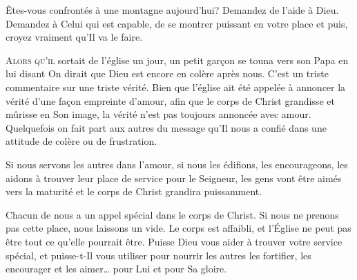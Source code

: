 Êtes-vous confrontés à une montagne aujourd'hui? Demandez de l'aide à Dieu.
 Demandez à Celui qui est capable, de se montrer puissant en votre place
 \ocadr et puis, croyez vraiment qu'Il va le faire.

\dvrule






\lettrine{A}{lors qu'il} sortait de l'église un jour,
 un petit gar\c{c}on se touna vers son Papa  en lui disant\frcolon {}
 \Og On dirait que Dieu est encore en colère après nous. \Fg{}
 C'est un triste commentaire sur une triste vérité.
 Bien que l'église ait été appelée à annoncer la vérité
 d'une fa\c{c}on empreinte d'amour, afin que le corps de Christ grandisse
 et mûrisse en Son image, la vérité n'est pas toujours annoncée avec amour.
 Quelquefois  on fait part aux autres du message
 qu'Il nous a confié dans une attitude de colère ou de frustration. 


Si nous servons les autres dans l'amour, si nous les édifions,
 les encourageons, les aidons à trouver leur place de service
 pour le Seigneur, les gens vont être aimés vers la maturité
 \ocadr et le corps de Christ grandira puissamment.

Chacun de nous a un appel spécial dans le corps de Christ.
 Si nous ne prenons pas cette place, nous laissons un vide.
 Le corps est affaibli, et l'Église 
 ne peut pas être tout ce qu'elle pourrait être.
 Puisse Dieu vous aider à trouver votre service spécial,
 et puisse-t-Il vous utiliser pour nourrir les autres
 \ocadr les fortifier, les encourager et les aimer\dots{}
 pour Lui et pour Sa gloire.

\dvrule



